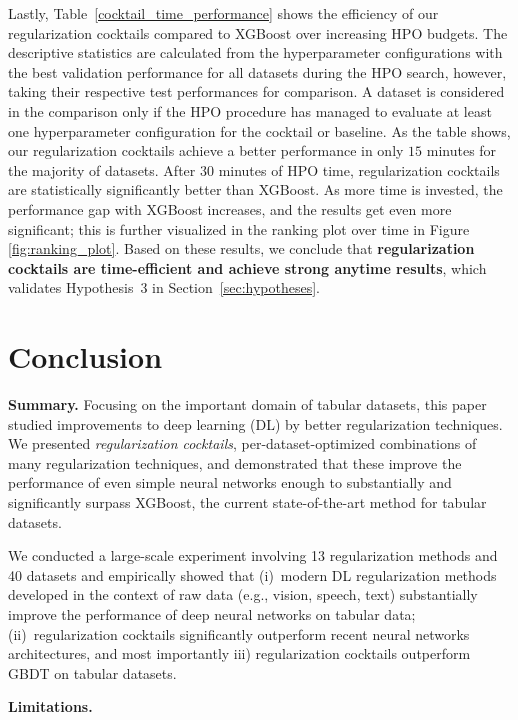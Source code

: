 Lastly, Table~\ref{cocktail_time_performance} shows the efficiency of our regularization cocktails compared to XGBoost over increasing HPO budgets. The descriptive statistics are calculated from the hyperparameter configurations with the best validation performance for all datasets during the HPO search, however, taking their respective test performances for comparison. A dataset is considered in the comparison only if the HPO procedure has managed to evaluate at least one hyperparameter configuration for the cocktail or baseline. As the table shows, our regularization cocktails achieve a better performance in only $15$ minutes for the majority of datasets. After $30$ minutes of HPO time, regularization cocktails are statistically significantly better than XGBoost. As more time is invested, the performance gap with XGBoost increases, and the results get even more significant; this is further visualized in the ranking plot over time in Figure \ref{fig:ranking_plot}. Based on these results, we conclude that \textbf{regularization cocktails are time-efficient and achieve strong anytime results}, which validates Hypothesis~3 in Section~\ref{sec:hypotheses}. 

\section{Conclusion}
\label{conclusion}

\textbf{Summary.} 
Focusing on the important domain of tabular datasets, this paper studied improvements to deep learning (DL) by better regularization techniques. We presented \emph{regularization cocktails}, per-dataset-optimized combinations of many regularization techniques, and demonstrated that these improve the performance of even simple neural networks enough to substantially and significantly surpass XGBoost, the current state-of-the-art method for tabular datasets.

We conducted a large-scale experiment involving 13 regularization methods and 40 datasets and empirically showed that (i)~modern DL regularization methods developed in the context of raw data (e.g., vision, speech, text) substantially improve the performance of deep neural networks on tabular data; (ii)~regularization cocktails significantly outperform recent neural networks architectures, and most importantly iii) regularization cocktails outperform GBDT on tabular datasets. 

\textbf{Limitations.} 

